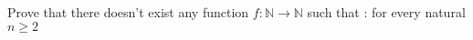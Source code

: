 Prove that there doesn't exist any function $f:\mathbb{N}\rightarrow \mathbb{N}$ such that :
 for every natural $n\geq2$